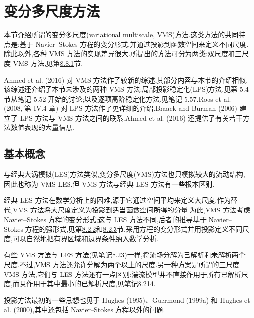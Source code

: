 \section{变分多尺度方法}\label{sec:variational-multiscale-methods}

\begin{note}[内容]
\label{note:vms-contents}
本节介绍所谓的变分多尺度(variational multiscale, VMS)方法.这类方法的共同特点是:基于 Navier--Stokes 方程的变分形式,并通过投影到函数空间来定义不同尺度.除此以外,各种 VMS 方法的实现差异很大.所提出的方法可分为两类:双尺度和三尺度 VMS 方法,见第\hyperref[subsec:vms-basic-concepts]{8.8.1}节.

Ahmed et al. (2016) 对 VMS 方法作了较新的综述,其部分内容与本节的介绍相似.该综述还介绍了本节未涉及的两种 VMS 方法:局部投影稳定化(LPS)方法,见第 5.4 节从笔记 5.52 开始的讨论;以及逐项高阶稳定化方法,见笔记 5.57.Roos et al. (2008, 第 IV.4 章) 对 LPS 方法作了更详细的介绍.Braack and Burman (2006) 建立了 LPS 方法与 VMS 方法之间的联系.Ahmed et al. (2016) 还提供了有关若干方法数值表现的大量信息.
\end{note}

\subsection{基本概念}\label{subsec:vms-basic-concepts}

\begin{note}[与大涡模拟的区别]
\label{note:vms-differences-from-les}
与经典大涡模拟(LES)方法类似,变分多尺度(VMS)方法也只模拟较大的流动结构,因此也称为 VMS-LES.但 VMS 方法与经典 LES 方法有一些根本区别.

经典 LES 方法在数学分析上的困难,源于它通过空间平均来定义大尺度.作为替代,VMS 方法将大尺度定义为投影到适当函数空间所得的分量.为此,VMS 方法考虑 Navier--Stokes 方程的变分形式;这与 LES 方法不同,后者的推导基于 Navier--Stokes 方程的强形式,见第\hyperref[subsec:les-space-averaged-equations-full-space]{8.2.2}和\hyperref[subsec:les-space-averaged-equations-bounded-domain]{8.2.3}节.采用方程的变分形式并用投影定义不同尺度,可以自然地把有界区域和边界条件纳入数学分析.

有些 VMS 方法与 LES 方法(见笔记\hyperref[note:large-eddy-simulation-basic-idea]{8.23})一样,将流场分解为已解析和未解析两个尺度.不过,VMS 方法还允许分解为两个以上的尺度.另一种方案是所谓的三尺度 VMS 方法,它们与 LES 方法还有一点区别:湍流模型并不直接作用于所有已解析尺度,而只作用于其中最小的已解析尺度,见笔记\hyperref[note:vms-three-scale-approach]{8.214}.

投影方法最初的一些思想也见于 Hughes (1995)、Guermond (1999a) 和 Hughes et al. (2000),其中还包括 Navier--Stokes 方程以外的问题.
\end{note}

